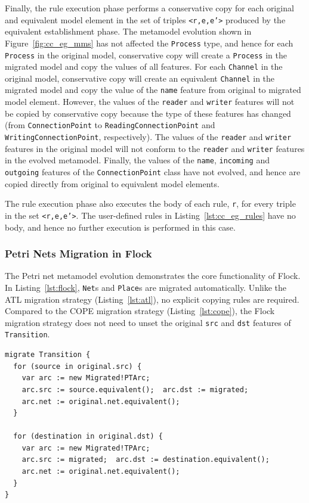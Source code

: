 Finally, the rule execution phase performs a conservative copy for each original and equivalent model element in the set of triples \texttt{<r,e,e'>} produced by the equivalent establishment phase. The metamodel evolution shown in Figure~\ref{fig:cc_eg_mms} has not affected the \texttt{Pr\-oc\-e\-ss} type, and hence for each \texttt{Pr\-oc\-e\-ss} in the original model, conservative copy will create a \texttt{Pr\-oc\-e\-ss} in the migrated model and copy the values of all features. For each \texttt{Ch\-an\-n\-el} in the original model, conservative copy will create an equivalent \texttt{Ch\-an\-n\-el} in the migrated model and copy the value of the \texttt{na\-me} feature from original to migrated model element. However, the values of the \texttt{re\-ad\-er} and \texttt{wr\-it\-er} features will not be copied by conservative copy because the type of these features has changed (from \texttt{Co\-nn\-ec\-ti\-o\-nP\-oi\-nt} to \texttt{Re\-a\-di\-ngCo\-nn\-ec\-ti\-o\-nP\-oi\-nt} and \texttt{Wr\-i\-ti\-ngCo\-nn\-ec\-ti\-o\-nP\-oi\-nt}, respectively). The values of the \texttt{re\-ad\-er} and \texttt{wr\-it\-er} features in the original model will not conform to the \texttt{re\-ad\-er} and \texttt{wr\-it\-er} features in the evolved metamodel. Finally, the values of the \texttt{na\-me}, \texttt{in\-co\-mi\-ng} and \texttt{ou\-tg\-oi\-ng} features of the \texttt{Co\-nn\-ec\-ti\-o\-nP\-oi\-nt} class have not evolved, and hence are copied directly from original to equivalent model elements.

The rule execution phase also executes the body of each rule, \texttt{r}, for every triple in the set \texttt{<r,e,e'>}. The user-defined rules in Listing~\ref{lst:cc_eg_rules} have no body, and hence no further execution is performed in this case.

\subsubsection{Petri Nets Migration in Flock}
The Petri net metamodel evolution demonstrates the core functionality of Flock. In Listing~\ref{lst:flock}, \texttt{Net}s and \texttt{Place}s are migrated automatically. Unlike the ATL migration strategy (Listing~\ref{lst:atl}), no explicit copying rules are required. Compared to the COPE migration strategy (Listing~\ref{lst:cope}), the Flock migration strategy does not need to unset the original \texttt{src} and \texttt{dst} features of \texttt{Transition}.

\begin{lstlisting}[caption=Petri nets model migration in Flock, label=lst:flock, language=Flock]
migrate Transition {
  for (source in original.src) {
    var arc := new Migrated!PTArc;
    arc.src := source.equivalent();  arc.dst := migrated;
    arc.net := original.net.equivalent();
  }

  for (destination in original.dst) {
    var arc := new Migrated!TPArc;
    arc.src := migrated;  arc.dst := destination.equivalent();
    arc.net := original.net.equivalent();
  }
}
\end{lstlisting}

